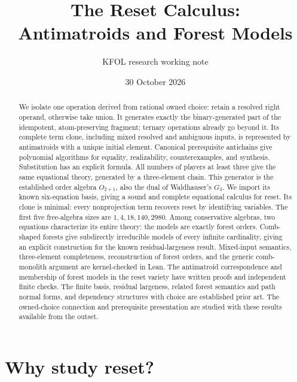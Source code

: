 \documentclass[11pt]{article}
\title{The Reset Calculus:\\Antimatroids and Forest Models}
\author{KFOL research working note}
\date{30 October 2026}
\begin{document}
\maketitle
\begin{abstract}
We isolate one operation derived from rational owned choice: retain a
resolved right operand, otherwise take union. It generates exactly the
binary-generated part of the idempotent, atom-preserving fragment;
ternary operations already go beyond it. Its complete term clone,
including mixed resolved and ambiguous inputs, is represented by
antimatroids with a unique initial element. Canonical prerequisite
antichains give polynomial algorithms for equality, realizability,
counterexamples, and synthesis. Substitution has an explicit formula.
All numbers of players at least three give the same equational theory,
generated by a three-element chain. This generator is the established
order algebra $O_{2+1}$, also the dual of Waldhauser's $G_3$.
We import its known six-equation basis, giving a sound and complete
equational calculus for reset. Its clone is minimal: every
nonprojection term recovers reset by identifying variables. The first
five free-algebra sizes are $1,4,18,140,2980$. Among conservative algebras,
two equations characterize its entire theory: the models are exactly
forest orders. Comb-shaped forests give subdirectly irreducible models
of every infinite cardinality, giving an explicit construction for the
known residual-largeness result.
Mixed-input semantics, three-element completeness, reconstruction of
forest orders, and the generic comb-monolith argument are kernel-checked
in Lean. The antimatroid correspondence and membership of forest models
in the reset variety have written proofs and independent finite checks.
The finite basis, residual largeness, related forest semantics and path
normal forms, and dependency structures with choice are established
prior art. The owned-choice connection and prerequisite presentation
are studied with these results available from the outset.
\end{abstract}

\section{Why study reset?}
\end{document}
